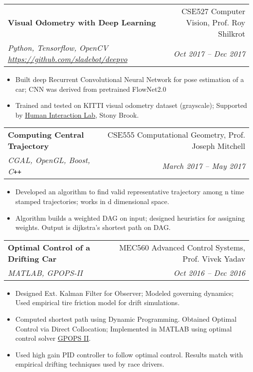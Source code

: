 \documentclass[letterpaper,10pt]{article}
\makeatletter
\newcommand{\resumeHeading}[4]{
  \vspace{-1pt}
    \begin{tabular*}{0.97\textwidth}{l@{\extracolsep{\fill}}r}
      \textbf{#1} & #2 \vspace{-2pt}\\ \vspace{1pt}
      \textit{\small#3} & \textit{\small #4} \\
    \end{tabular*}
}
\newcommand{\resumeItemListStart}{
\vspace{-7pt}
\begin{itemize}[leftmargin=14pt]
}
\newcommand{\resumeItemListEnd}{
\vspace{+7pt}
\end{itemize}
}
\newcommand{\resumeItem}[1]{
  \item\small{
      {#1 \vspace{-7pt}
      }
  }
}
\makeatother
\begin{document}
    \resumeHeading{Visual Odometry with Deep Learning}{CSE527 Computer Vision, Prof. Roy Shilkrot} {Python, Tensorflow, OpenCV \href{https://github.com/sladebot/deepvo}{https://github.com/sladebot/deepvo}}{Oct 2017 -- Dec 2017}
    \resumeItemListStart
      \resumeItem{Built deep Recurrent Convolutional Neural Network for pose estimation of a car; CNN was derived from pretrained FlowNet2.0}
      \resumeItem{Trained and tested on KITTI visual odometry dataset (grayscale); Supported by \href{http://hi.cs.stonybrook.edu/}{Human Interaction Lab}, Stony Brook.}
    \resumeItemListEnd


    \resumeHeading{Computing Central Trajectory}{CSE555 Computational Geometry, Prof. Joseph Mitchell}{CGAL, OpenGL, Boost, C\texttt{++}}{March 2017 -- May 2017}
    \resumeItemListStart
      \resumeItem{Developed an algorithm to find valid representative trajectory among n time stamped trajectories; works in d dimensional space.}
      \resumeItem{Algorithm builds a weighted DAG on input; designed heuristics for assigning weights. Output is dijkstra's shortest path on DAG.}
    \resumeItemListEnd
    \vspace{-10pt}

    \resumeHeading{Optimal Control of a Drifting Car}{MEC560 Advanced Control Systems, Prof. Vivek Yadav}{MATLAB, GPOPS-II}{Oct 2016 -- Dec 2016}
    \resumeItemListStart
      \resumeItem{Designed Ext. Kalman Filter for Observer; Modeled governing dynamics; Used empirical tire friction model for drift simulations.}
      \resumeItem{Computed shortest path using Dynamic Programming. Obtained Optimal Control via Direct Collocation; Implemented in MATLAB using optimal control solver \href{http://www.gpops2.com/}{GPOPS II}.}
      \resumeItem{Used high gain PID controller to follow optimal control. Results match with empirical drifting techniques used by race drivers.}
    \resumeItemListEnd

\end{document}
